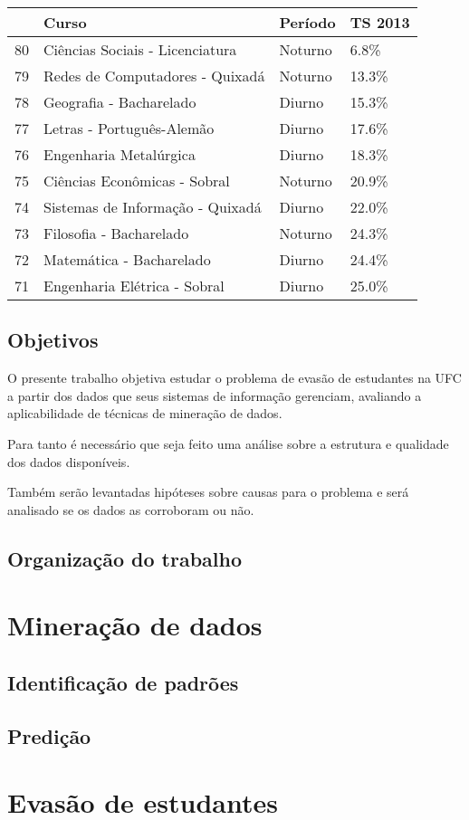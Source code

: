 \documentclass[a4paper]{article}
\begin{document}
\begin{tabular}{llll}
\toprule
{} &                             Curso &  Período & TS 2013 \\
\midrule
80 &   Ciências Sociais - Licenciatura &  Noturno &    6.8\% \\
79 &   Redes de Computadores - Quixadá &  Noturno &   13.3\% \\
78 &           Geografia - Bacharelado &   Diurno &   15.3\% \\
77 &         Letras - Português-Alemão &   Diurno &   17.6\% \\
76 &            Engenharia Metalúrgica &   Diurno &   18.3\% \\
75 &      Ciências Econômicas - Sobral &  Noturno &   20.9\% \\
74 &  Sistemas de Informação - Quixadá &   Diurno &   22.0\% \\
73 &           Filosofia - Bacharelado &  Noturno &   24.3\% \\
72 &          Matemática - Bacharelado &   Diurno &   24.4\% \\
71 &      Engenharia Elétrica - Sobral &   Diurno &   25.0\% \\
\bottomrule
\end{tabular}


\subsection{Objetivos}
O presente trabalho objetiva estudar o problema de evasão de estudantes na UFC a partir dos dados que seus sistemas de informação gerenciam, avaliando a aplicabilidade de técnicas de mineração de dados. 

Para tanto é necessário que seja feito uma análise sobre a estrutura e qualidade dos dados disponíveis.

Também serão levantadas hipóteses sobre causas para o problema e será analisado se os dados as corroboram ou não.

\subsection{Organização do trabalho}

\section{Mineração de dados}
\subsection{Identificação de padrões}
\subsection{Predição}
\cite{Tom_mitchell} \cite{ML_debt} \cite{ML_know}


\section{Evasão de estudantes}
\cite{EDM_pred_dropout} \cite{EDM_review_and_soa} \cite{EDM_retention} \cite{EDM_education}


\end{document}
